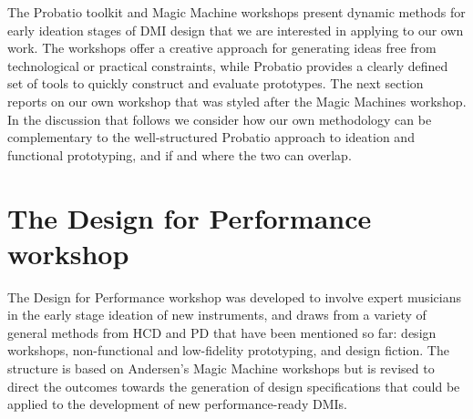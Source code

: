 \documentclass[letterpaper, 12pt]{article}
\begin{document}
The Probatio toolkit and Magic Machine workshops present dynamic methods for early ideation stages of DMI design that we are interested in applying to our own work. The workshops offer a creative approach for generating ideas free from technological or practical constraints, while Probatio provides a clearly defined set of tools to quickly construct and evaluate prototypes. The next section reports on our own workshop that was styled after the Magic Machines workshop.
In the discussion that follows we consider how our own methodology can be complementary to the well-structured Probatio approach to ideation and functional prototyping, and if and where the two can overlap. 

\section{The Design for Performance workshop}
\label{ch3-sec:design-for-performance-workshop}

The Design for Performance workshop was developed to involve expert musicians in the early stage ideation of new instruments, and draws from a variety of general methods from HCD and PD that have been mentioned so far: design workshops, non-functional and low-fidelity prototyping, and design fiction. 
The structure is based on Andersen's Magic Machine workshops but is revised to direct the outcomes towards the generation of design specifications that could be applied to the development of new performance-ready DMIs. 
\end{document}
